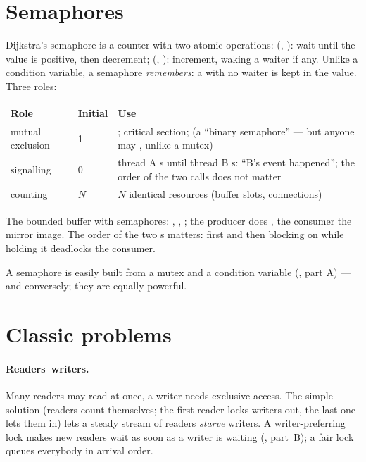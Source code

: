 \section{Semaphores}

Dijkstra's semaphore is a counter with two atomic operations:
 (, ): wait until the value is
positive, then decrement;  (, ):
increment, waking a waiter if any. Unlike a condition variable, a
semaphore \emph{remembers}: a  with no waiter is kept in the
value. Three roles:

\begin{center}
\begin{tabular}{L{2.8cm}L{2cm}L{8.4cm}}
\toprule
\textbf{Role} & \textbf{Initial} & \textbf{Use} \\
\midrule
mutual exclusion & 1 & ; critical section;  (a
``binary semaphore'' --- but anyone may , unlike a mutex) \\
signalling & 0 & thread A s until thread B s:
``B's event happened''; the order of the two calls does not matter \\
counting & $N$ & $N$ identical resources (buffer slots, connections) \\
\bottomrule
\end{tabular}
\end{center}

The bounded buffer with semaphores: , ,
; the producer does , the consumer the mirror image. The order of the
two s matters:  first and then blocking on
 while holding it deadlocks the consumer.

A semaphore is easily built from a mutex and a condition variable
(, part A) --- and conversely; they are equally powerful.

\section{Classic problems}

\paragraph{Readers--writers.} Many readers may read at once, a writer
needs exclusive access. The simple solution (readers count themselves;
the first reader locks writers out, the last one lets them in) lets a
steady stream of readers \emph{starve} writers. A writer-preferring lock
makes new readers wait as soon as a writer is waiting (,
part~B); a fair lock queues everybody in arrival order.


